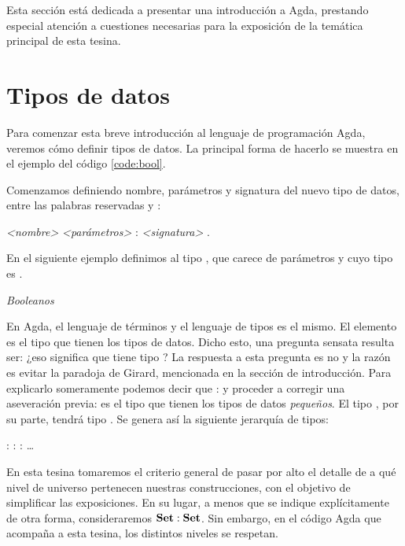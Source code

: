 Esta sección está dedicada a presentar una introducción a Agda, prestando especial atención a cuestiones necesarias para la exposición de la temática principal de esta tesina. 
\newpage

\section{Tipos de datos}\label{agda:data}

Para comenzar esta breve introducción al lenguaje de programación Agda, veremos cómo definir tipos de datos. La principal forma de hacerlo se muestra en el ejemplo del código \ref{code:bool}.

Comenzamos definiendo nombre, parámetros y signatura del nuevo tipo de datos, entre las palabras reservadas  y :

 {\it <nombre>} {\it <parámetros>} : {\it <signatura>} .

En el siguiente ejemplo definimos al tipo , que carece de parámetros y cuyo tipo es .

\begin{agdacode}{\it Booleanos}\label{code:bool}
  
\end{agdacode}

En Agda, el lenguaje de términos y el lenguaje de tipos es el mismo. El elemento  es el tipo que tienen los tipos de datos. Dicho esto, una pregunta sensata resulta ser: ¿eso significa que  tiene tipo ? La respuesta a esta pregunta es no
y la razón es evitar la paradoja de Girard, mencionada en la sección de introducción.
Para explicarlo someramente podemos decir que  :  y proceder a corregir una aseveración previa:  es el tipo que tienen los tipos de datos {\it pequeños}. El tipo , por su parte, tendrá tipo . Se genera así la siguiente jerarquía de tipos:

\sangrar
{} :  :  :  \ldots

En esta tesina tomaremos el criterio general de pasar por alto el detalle de a qué nivel de universo pertenecen nuestras construcciones, con el objetivo de simplificar las exposiciones. En su lugar, a menos que se indique explícitamente de otra forma, consideraremos $\mathbf{Set} : \mathbf{Set}$. Sin embargo, en el código Agda que acompaña a esta tesina, los distintos niveles se respetan.

